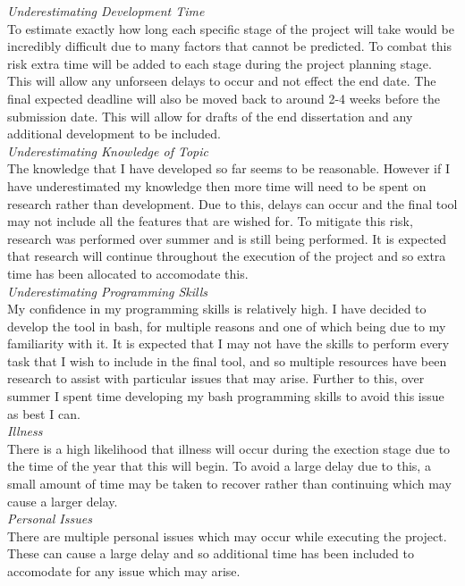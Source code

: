 \documentclass[11pt,a4paper]{article}
\begin{document}
\textit{Underestimating Development Time}\\
To estimate exactly how long each specific stage of the project will take would be incredibly difficult due to many factors that cannot be predicted. To combat this risk extra time will be added to each stage during the project planning stage. This will allow any unforseen delays to occur and not effect the end date. The final expected deadline will also be moved back to around 2-4 weeks before the submission date. This will allow for drafts of the end dissertation and any additional development to be included.\\

\textit{Underestimating Knowledge of Topic}\\
The knowledge that I have developed so far seems to be reasonable. However if I have underestimated my knowledge then more time will need to be spent on research rather than development. Due to this, delays can occur and the final tool may not include all the features that are wished for. To mitigate this risk, research was performed over summer and is still being performed. It is expected that research will continue throughout the execution of the project and so extra time has been allocated to accomodate this.\\

\textit{Underestimating Programming Skills}\\
My confidence in my programming skills is relatively high. I have decided to develop the tool in bash, for multiple reasons and one of which being due to my familiarity with it. It is expected that I may not have the skills to perform every task that I wish to include in the final tool, and so multiple resources have been research to assist with particular issues that may arise. Further to this, over summer I spent time developing my bash programming skills to avoid this issue as best I can.\\

\textit{Illness}\\
There is a high likelihood that illness will occur during the exection stage due to the time of the year that this will begin. To avoid a large delay due to this, a small amount of time may be taken to recover rather than continuing which may cause a larger delay.\\

\textit{Personal Issues}\\
There are multiple personal issues which may occur while executing the project. These can cause a large delay and so additional time has been included to accomodate for any issue which may arise.\\
\end{document}
